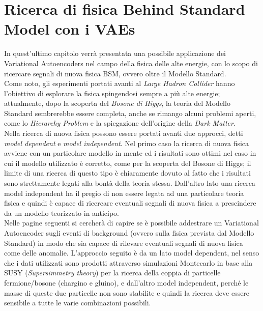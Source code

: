 \section{Ricerca di fisica Behind Standard Model con i VAEs}
\label{fisica_BSM_VAEs}

In quest'ultimo capitolo verrà presentata una possibile applicazione dei Variational Autoencoders nel campo della fisica delle alte energie, con lo scopo di ricercare segnali di nuova fisica BSM, ovvero oltre il Modello Standard. \\
Come noto, gli esperimenti portati avanti al \textit{Large Hadron Collider} hanno l'obiettivo di esplorare la fisica spingendosi sempre a più alte energie; attualmente, dopo la scoperta del \textit{Bosone di Higgs}, la teoria del Modello Standard sembrerebbe essere completa, anche se rimango alcuni problemi aperti, come lo \textit{Hierarchy Problem} e la spiegazione dell'origine della \textit{Dark Matter}. \\
Nella ricerca di nuova fisica possono essere portati avanti due approcci, detti \textit{model dependent} e \textit{model independent}. Nel primo caso la ricerca di nuova fisica avviene con un particolare modello in mente ed i risultati sono ottimi nel caso in cui il modello utilizzato è corretto, come per la scoperta del Bosone di Higgs; il limite di una ricerca di questo tipo è chiaramente dovuto al fatto che i risultati sono strettamente legati alla bontà della teoria stessa. Dall'altro lato una ricerca model independent ha il pregio di non essere legata ad una particolare teoria fisica e quindi è capace di ricercare eventuali segnali di nuova fisica a prescindere da un modello teorizzato in anticipo.\\
Nelle pagine seguenti si cercherà di capire se è possibile addestrare un Variational Autoencoder sugli eventi di background (ovvero sulla fisica prevista dal Modello Standard) in modo che sia capace di rilevare eventuali segnali di nuova fisica come delle anomalie. L'approccio seguito è da un lato model dependent, nel senso che i dati utilizzati sono prodotti attraverso simulazioni Montecarlo in base alla SUSY (\textit{Supersimmetry theory}) per la ricerca della coppia di particelle fermione/bosone (chargino e gluino), e dall'altro model independent, perché le masse di queste due particelle non sono stabilite e quindi la ricerca deve essere sensibile a tutte le varie combinazioni possibili.
